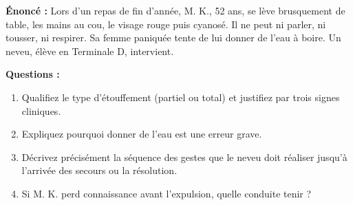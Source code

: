\documentclass[11pt]{article}
\begin{document}
\begin{exoresolu}
\textbf{Énoncé :} Lors d'un repas de fin d'année, M. K., 52 ans, se lève brusquement de table, les mains au cou, le visage rouge puis cyanosé. Il ne peut ni parler, ni tousser, ni respirer. Sa femme paniquée tente de lui donner de l'eau à boire. Un neveu, élève en Terminale D, intervient.

\textbf{Questions :}
\begin{enumerate}
    \item Qualifiez le type d'étouffement (partiel ou total) et justifiez par trois signes cliniques.
    \item Expliquez pourquoi donner de l'eau est une erreur grave.
    \item Décrivez précisément la séquence des gestes que le neveu doit réaliser jusqu'à l'arrivée des secours ou la résolution.
    \item Si M. K. perd connaissance avant l'expulsion, quelle conduite tenir ?
\end{enumerate}


\end{exoresolu}
\end{document}
